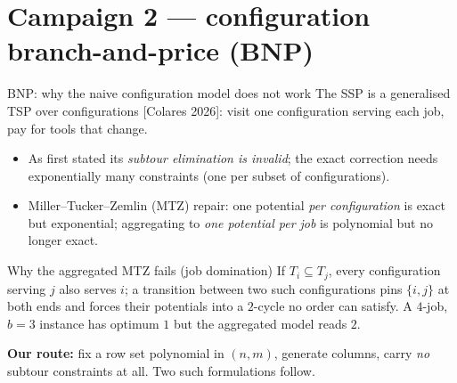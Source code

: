 \documentclass[10pt]{beamer}
\newcommand{\good}[1]{\textcolor{tight}{#1}}
\newcommand{\bad}[1]{\textcolor{acc}{#1}}
\begin{document}
\section{Campaign 2 --- configuration branch-and-price (BNP)}
\begin{frame}{BNP: why the naive configuration model does not work}
The SSP is a generalised TSP over configurations {\footnotesize[Colares 2026]}: visit
one configuration serving each job, pay for tools that change.
\begin{itemize}
  \item As first stated its \emph{subtour elimination is invalid}; the exact correction
        needs \bad{exponentially many} constraints (one per subset of configurations).
  \item Miller--Tucker--Zemlin (MTZ) repair: one potential \emph{per configuration} is
        exact but exponential; aggregating to \emph{one potential per job} is polynomial
        but \bad{no longer exact}.
\end{itemize}
\begin{alertblock}{Why the aggregated MTZ fails (job domination)}
If $T_i\subseteq T_j$, every configuration serving $j$ also serves $i$; a transition
between two such configurations pins $\{i,j\}$ at both ends and forces their potentials
into a $2$-cycle no order can satisfy. A $4$-job, $b=3$ instance has optimum $1$ but the
aggregated model reads $2$.
\end{alertblock}
\textbf{Our route:} fix a row set \good{polynomial in $(n,m)$}, generate columns, carry
\emph{no} subtour constraints at all. Two such formulations follow.
\end{frame}
\end{document}

